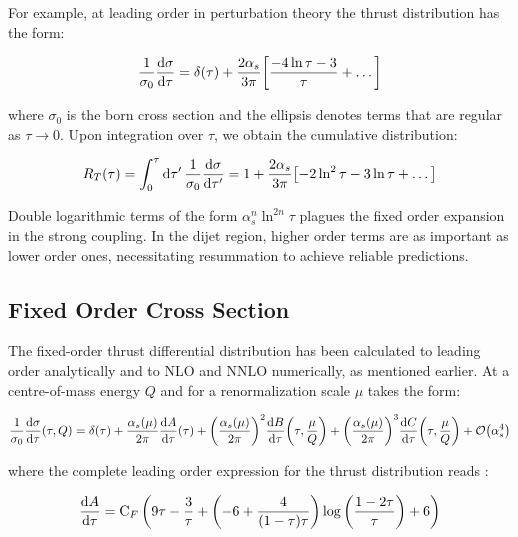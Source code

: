\documentclass[../main.tex]{subfiles}
\begin{document}
For example, at leading order in perturbation theory the thrust distribution has the form:

\begin{equation}\label{eq:LO fixed order}
    \frac{1}{\sigma_0}\dv{\sigma}{\tau} = \delta(\tau) + \frac{2\alpha_s}{3\pi} \qty[\frac{-4 \ln \tau - 3}{\tau} + \dots]
\end{equation}

where $\sigma_0$ is the born cross section and the ellipsis denotes terms that are regular as $\tau \to 0$. 
Upon integration over $\tau$, we obtain the cumulative distribution:

\begin{equation}
    R_T(\tau) = \int_0^\tau \dd{\tau'} \frac{1}{\sigma_0}\dv{\sigma}{\tau'} = 1 + \frac{2\alpha_s}{3\pi} \qty[-2 \ln^2 \tau - 3 \ln \tau + \dots] 
\end{equation}

Double logarithmic terms of the form $\alpha_s^n \ln^{2n}\tau$ plagues the fixed order expansion in the strong coupling. In the dijet region, higher order 
terms are as important as lower order ones, necessitating resummation to achieve reliable predictions.

\subsection{Fixed Order Cross Section}

The fixed-order thrust differential distribution has been calculated to leading order analytically and
to NLO and NNLO numerically, as mentioned earlier. At a centre-of-mass energy $Q$ and for a renormalization scale $\mu$ takes the form:

\begin{equation}\label{eq:Fixed_order}
    \frac{1}{\sigma_0} \dv{\sigma}{\tau} \qty(\tau,Q) = \delta(\tau) + \frac{\alpha_s(\mu)}{2\pi}\dv{A}{\tau} \qty(\tau) + \qty(\frac{\alpha_s(\mu)}{2\pi})^2 \dv{B}{\tau} \qty(\tau,\frac{\mu}{Q}) + \qty(\frac{\alpha_s(\mu)}{2\pi})^3 \dv{C}{\tau} \qty(\tau,\frac{\mu}{Q}) + \order{\alpha_s^4}
\end{equation}

where the complete leading order expression for the thrust distribution reads \cite{Ellis:1980wv}:

\begin{equation}\label{eq:Fixed_order_A}
    \dv{A}{\tau}(\tau) =  \text{C}_F \left(9 \tau -\frac{3}{\tau }+\left(-6 +\frac{4}{(1-\tau ) \tau }\right) \log \left(\frac{1-2 \tau }{\tau }\right)+6\right)
\end{equation}
\end{document}
